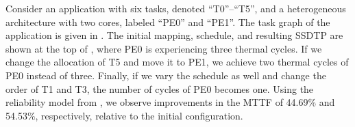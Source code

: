 Consider an application with six tasks, denoted ``T0''--``T5'', and a heterogeneous architecture with two cores, labeled ``PE0'' and ``PE1''. The task graph of the application is given in . The initial mapping, schedule, and resulting SSDTP are shown at the top of , where PE0 is experiencing three thermal cycles. If we change the allocation of T5 and move it to PE1, we achieve two thermal cycles of PE0 instead of three. Finally, if we vary the schedule as well and change the order of T1 and T3, the number of cycles of PE0 becomes one. Using the reliability model from , we observe improvements in the MTTF of 44.69\% and 54.53\%, respectively, relative to the initial configuration.
